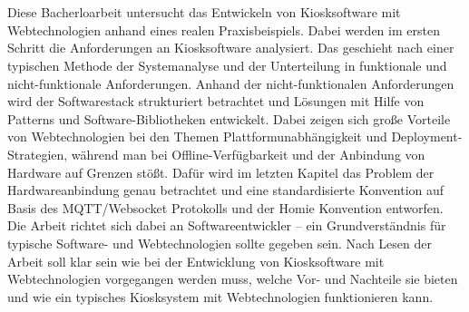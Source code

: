 \chapter{\abstractname}

Diese Bacherloarbeit untersucht das Entwickeln von Kiosksoftware mit Webtechnologien
anhand eines realen Praxisbeispiels. Dabei werden im ersten Schritt die Anforderungen
an Kiosksoftware analysiert. Das geschieht nach einer typischen Methode der Systemanalyse
und der Unterteilung in funktionale und nicht-funktionale Anforderungen. 
Anhand der nicht-funktionalen Anforderungen
wird der Softwarestack strukturiert betrachtet und Lösungen mit Hilfe von Patterns und 
Software-Bibliotheken entwickelt. 
Dabei zeigen sich große Vorteile von Webtechnologien bei den Themen
Plattformunabhängigkeit und Deployment-Strategien, während man bei Offline-Verfügbarkeit und der
Anbindung von Hardware auf Grenzen stößt. Dafür wird im letzten Kapitel das Problem der
Hardwareanbindung genau betrachtet und eine standardisierte Konvention auf
Basis des MQTT/Websocket Protokolls und der Homie Konvention entworfen.\\
Die Arbeit richtet sich dabei an Softwareentwickler -- ein Grundverständnis für typische 
Software- und Webtechnologien sollte gegeben sein. Nach Lesen der Arbeit soll klar sein
wie bei der Entwicklung von Kiosksoftware mit Webtechnologien vorgegangen werden muss, welche
Vor- und Nachteile sie bieten und wie ein typisches Kiosksystem mit Webtechnologien funktionieren
kann. \\

\iffalse
- wie typische Anforderungen an Kiosksoftware mit Webtechnologien erfüllt werden können
- zum Beispiel Offline Verfügbarkeit und Geschlosssenheit 
\fi

